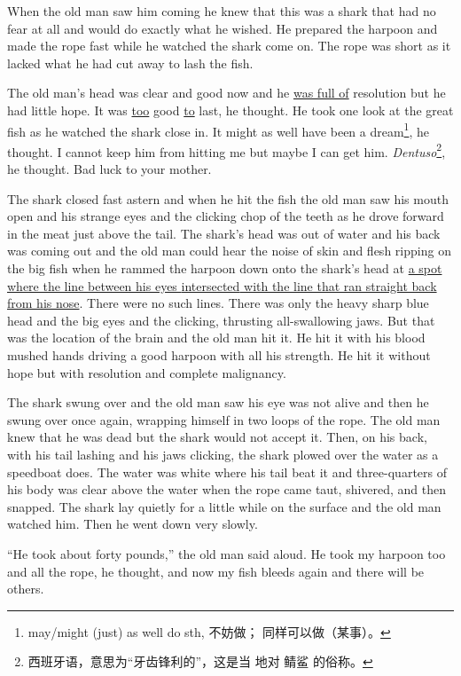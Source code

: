 \documentclass[fontset=ubuntu]{ctexrep}
\begin{document}
When the old man saw him coming he knew that this was a shark that had no
fear at all and would do exactly what he wished. He prepared the harpoon and
made the rope fast while he watched the shark come on. The rope was short as
it lacked what he had cut away to lash the fish.

The old man's head was clear and good now and he \uline{was full of} resolution
but he had little hope. It was \uline{too} good \uline{to} last, he thought. He
took one look at the great fish as he watched the shark close in. It might
as well have been a dream\footnote{may/might (just) as well do sth, 不妨做；
  同样可以做（某事）。}, he thought. I cannot keep him from hitting me but
maybe I can get him. \emph{Dentuso}\footnote{西班牙语，意思为“牙齿锋利的”，这是当
  地对 鲭鲨 的俗称。}, he thought. Bad luck to your mother.

The shark closed fast astern and when he hit the fish the old man saw his
mouth open and his strange eyes and the clicking chop of the teeth as he
drove forward in the meat just above the tail. The shark's head was out of
water and his back was coming out and the old man could hear the noise of
skin and flesh \gls{ripping} on the big fish when he \gls{rammed} the
harpoon down onto the shark's head at \uline{a spot where the line between his
  eyes \gls{intersected} with the line that ran straight back from his nose}.
There were no such lines. There was only the heavy sharp blue head and the
big eyes and the clicking, thrusting all-\gls{swallowing} jaws. But
that was the \gls{location} of the brain and the old man hit it. He hit it
with his blood \gls{mushed} hands driving a good harpoon with all his
strength. He hit it without hope but with resolution and complete
\gls{malignancy}.

The shark swung over and the old man saw his eye was not alive and then he
swung over once again, wrapping himself in two loops of the rope. The old
man knew that he was dead but the shark would not accept it. Then, on his
back, with his tail lashing and his jaws clicking, the shark \gls{plowed}
over the water as a \gls{speedboat} does. The water was white where his tail
beat it and three-\glspl{quarter} of his body was clear above the water when the
rope came taut, \gls{shivered}, and then \gls{snapped}. The shark lay
quietly for a little while on the surface and the old man watched him. Then
he went down very slowly.

``He took about forty pounds,'' the old man said aloud. He took my harpoon
too and all the rope, he thought, and now my fish bleeds again and there
will be others.
\end{document}
